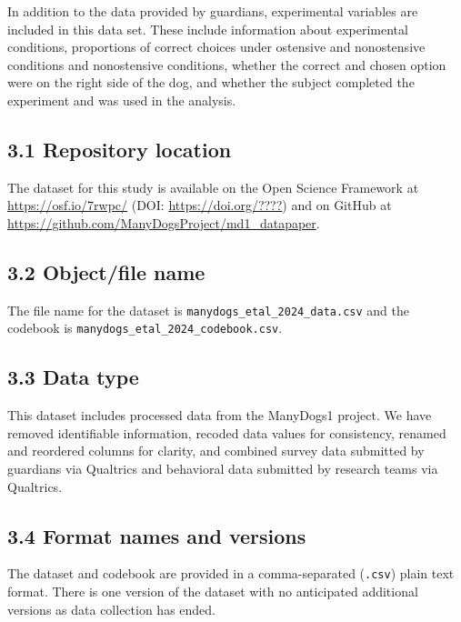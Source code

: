 \documentclass[
  pub,floatsintext]{apa6}
\begin{document}
In addition to the data provided by guardians, experimental variables are included in this data set. These include information about experimental conditions, proportions of correct choices under ostensive and nonostensive conditions and nonostensive conditions, whether the correct and chosen option were on the right side of the dog, and whether the subject completed the experiment and was used in the analysis.

\hypertarget{repository-location}{%
\subsection{3.1 Repository location}\label{repository-location}}

The dataset for this study is available on the Open Science Framework at \url{https://osf.io/7rwpc/} (DOI: \url{https://doi.org/????}) and on GitHub at \url{https://github.com/ManyDogsProject/md1_datapaper}.

\hypertarget{objectfile-name}{%
\subsection{3.2 Object/file name}\label{objectfile-name}}

The file name for the dataset is \texttt{manydogs\_etal\_2024\_data.csv} and the codebook is \texttt{manydogs\_etal\_2024\_codebook.csv}.

\hypertarget{data-type}{%
\subsection{3.3 Data type}\label{data-type}}

This dataset includes processed data from the ManyDogs1 project. We have removed identifiable information, recoded data values for consistency, renamed and reordered columns for clarity, and combined survey data submitted by guardians via Qualtrics and behavioral data submitted by research teams via Qualtrics.

\hypertarget{format-names-and-versions}{%
\subsection{3.4 Format names and versions}\label{format-names-and-versions}}

The dataset and codebook are provided in a comma-separated (\texttt{.csv}) plain text format. There is one version of the dataset with no anticipated additional versions as data collection has ended.
\end{document}
